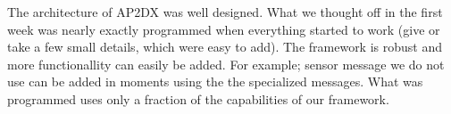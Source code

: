 The architecture of AP2DX was well designed. What we thought off in the first week
was nearly exactly programmed when everything started to work (give or take a few
small details, which were easy to add). The framework is robust and more functionallity
can easily be added. For example; sensor message we do not use can be added in moments 
using the the specialized messages. What was programmed uses only a fraction of the 
capabilities of our framework.
